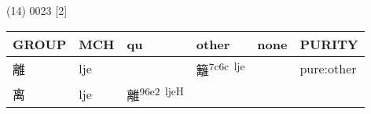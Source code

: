 \documentclass[14pt,a4paper]{scrartcl}
\begin{document}
(14) 0023 {[}2{]}

\begin{longtable}[c]{@{}llllll@{}}
\toprule
\begin{minipage}[b]{0.14\columnwidth}\raggedright\strut
GROUP
\strut\end{minipage} &
\begin{minipage}[b]{0.14\columnwidth}\raggedright\strut
MCH
\strut\end{minipage} &
\begin{minipage}[b]{0.14\columnwidth}\raggedright\strut
qu
\strut\end{minipage} &
\begin{minipage}[b]{0.14\columnwidth}\raggedright\strut
other
\strut\end{minipage} &
\begin{minipage}[b]{0.14\columnwidth}\raggedright\strut
none
\strut\end{minipage} &
\begin{minipage}[b]{0.14\columnwidth}\raggedright\strut
PURITY
\strut\end{minipage}\tabularnewline
\midrule
\endhead
\begin{minipage}[t]{0.14\columnwidth}\raggedright\strut
離
\strut\end{minipage} &
\begin{minipage}[t]{0.14\columnwidth}\raggedright\strut
lje
\strut\end{minipage} &
\begin{minipage}[t]{0.14\columnwidth}\raggedright\strut
\strut\end{minipage} &
\begin{minipage}[t]{0.14\columnwidth}\raggedright\strut
籬\textsuperscript{7c6c~lje}
\strut\end{minipage} &
\begin{minipage}[t]{0.14\columnwidth}\raggedright\strut
\strut\end{minipage} &
\begin{minipage}[t]{0.14\columnwidth}\raggedright\strut
pure:other
\strut\end{minipage}\tabularnewline
\begin{minipage}[t]{0.14\columnwidth}\raggedright\strut
离
\strut\end{minipage} &
\begin{minipage}[t]{0.14\columnwidth}\raggedright\strut
lje
\strut\end{minipage} &
\begin{minipage}[t]{0.14\columnwidth}\raggedright\strut
離\textsuperscript{96e2~ljeH}

\end{minipage}
\end{longtable}
\end{document}
